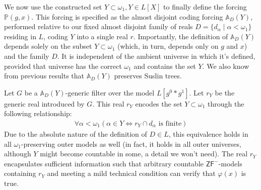 \documentclass[a4paper,11pt]{article}
\newcommand{\forceP}{\mathbb{P}}
\newcommand{\ZFP}{\mathsf{ZF}^-}
\begin{document}
We now use the constructed set $Y \subset \omega_1, Y \in L[X]$ to finally define the forcing $\forceP(g,x)$. This forcing is specified as the almost disjoint coding forcing $\mathbb{A}_D(Y)$, performed relative to our fixed almost disjoint family of reals $D = \{d_{\alpha} \mid \alpha < \omega_1\}$ residing in $L$, coding $Y$ into a single real $r$.
Importantly, the definition of $\mathbb{A}_D(Y)$ depends solely on the subset $Y \subset \omega_1$ (which, in turn, depends only on $g$ and $x$) and the family $D$. It is independent of the ambient universe in which it's defined, provided that universe has the correct $\omega_1$ and contains the set $Y$. We also know from previous results that $\mathbb{A}_D(Y)$ preserves Suslin trees.

Let $G$ be a $\mathbb{A}_D(Y)$-generic filter over the model $L[g^0 \ast g^1]$. Let $r_Y$ be the generic real introduced by $G$. This real $r_Y$ encodes the set $Y \subset \omega_1$ through the following relationship:
\begin{align*}
\forall \alpha < \omega_1 (\alpha \in Y \Leftrightarrow r_Y \cap d_{\alpha} \text{ is finite})
\end{align*}
Due to the absolute nature of the definition of $D \in L$, this equivalence holds in all $\omega_1$-preserving outer models as well (in fact, it holds in all outer universes, although $Y$ might become countable in some, a detail we won't need).
The real $r_Y$ encapsulates sufficient information such that arbitrary countable $\ZFP$-models containing $r_Y$ and meeting a mild technical condition can verify that $\varphi(x)$ is true.
\end{document}
